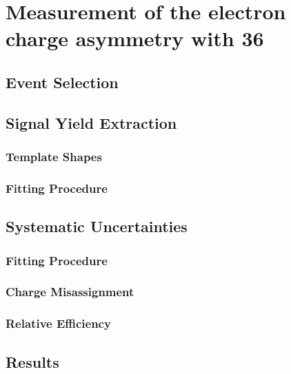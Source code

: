 \chapter{ 
Measurement of the electron charge asymmetry with \unit{36}{\invpb} }

\section{Event Selection}

\section{Signal Yield Extraction}

\subsection{Template Shapes}

\subsection{Fitting Procedure}

\section{Systematic Uncertainties}

\subsection{Fitting Procedure}

\subsection{Charge Misassignment}

\subsection{Relative Efficiency}

\section{Results}
